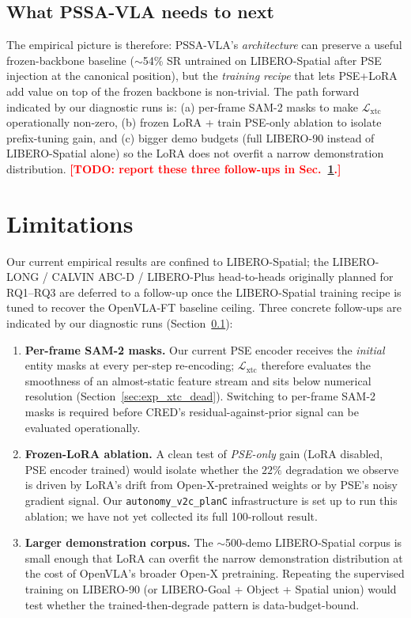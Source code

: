 \documentclass[10pt,letterpaper]{article}
\newcommand{\todo}[1]{\textcolor{red}{\textbf{[TODO: #1]}}}
\newcommand{\method}{\textsc{PSSA-VLA}\xspace}
\begin{document}
\subsection{What \method needs to next}
\label{sec:exp_outlook}

The empirical picture is therefore: \method's \emph{architecture} can
preserve a useful frozen-backbone baseline ($\sim$54\% SR untrained on
LIBERO-Spatial after PSE injection at the canonical position), but the
\emph{training recipe} that lets PSE+LoRA add value on top of the
frozen backbone is non-trivial. The path forward indicated by our
diagnostic runs is: (a) per-frame SAM-2 masks to make
$\mathcal{L}_\text{xtc}$ operationally non-zero,
(b) frozen LoRA + train PSE-only ablation to isolate prefix-tuning
gain, and (c) bigger demo budgets (full LIBERO-90 instead of
LIBERO-Spatial alone) so the LoRA does not overfit a narrow demonstration
distribution. \todo{report these three follow-ups in
Sec.~\ref{sec:limits}.}

\section{Limitations}\label{sec:limits}

Our current empirical results are confined to LIBERO-Spatial; the
LIBERO-LONG / CALVIN ABC-D / LIBERO-Plus head-to-heads originally
planned for RQ1--RQ3 are deferred to a follow-up once the
LIBERO-Spatial training recipe is tuned to recover the OpenVLA-FT
baseline ceiling. Three concrete follow-ups are indicated by our
diagnostic runs (Section~\ref{sec:exp_outlook}):

\begin{enumerate}
\item \textbf{Per-frame SAM-2 masks.} Our current PSE encoder receives
the \emph{initial} entity masks at every per-step re-encoding;
$\mathcal{L}_\text{xtc}$ therefore evaluates the smoothness of an
almost-static feature stream and sits below numerical resolution
(Section~\ref{sec:exp_xtc_dead}). Switching to per-frame SAM-2 masks
is required before CRED's residual-against-prior signal can be
evaluated operationally.

\item \textbf{Frozen-LoRA ablation.} A clean test of \emph{PSE-only}
gain (LoRA disabled, PSE encoder trained) would isolate whether the
$22\%$ degradation we observe is driven by LoRA's drift from
Open-X-pretrained weights or by PSE's noisy gradient signal. Our
\texttt{autonomy\_v2c\_planC} infrastructure is set up to run this
ablation; we have not yet collected its full 100-rollout result.

\item \textbf{Larger demonstration corpus.} The $\sim$500-demo
LIBERO-Spatial corpus is small enough that LoRA can overfit the
narrow demonstration distribution at the cost of OpenVLA's
broader Open-X pretraining. Repeating the supervised training on
LIBERO-90 (or LIBERO-Goal + Object + Spatial union) would test
whether the trained-then-degrade pattern is data-budget-bound.
\end{enumerate}
\end{document}
